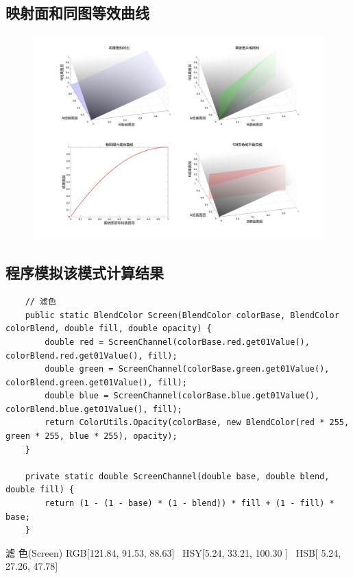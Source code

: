 \subsection{ 映射面和同图等效曲线}
\begin{figure}[h!]
	\centering
	\includegraphics[width=\linewidth]{figure/滤色}
	\caption{}
	\label{fig:}
\end{figure}


\subsection{ 程序模拟该模式计算结果}

\begin{lstlisting}
	// 滤色
	public static BlendColor Screen(BlendColor colorBase, BlendColor colorBlend, double fill, double opacity) {
		double red = ScreenChannel(colorBase.red.get01Value(), colorBlend.red.get01Value(), fill);
		double green = ScreenChannel(colorBase.green.get01Value(), colorBlend.green.get01Value(), fill);
		double blue = ScreenChannel(colorBase.blue.get01Value(), colorBlend.blue.get01Value(), fill);
		return ColorUtils.Opacity(colorBase, new BlendColor(red * 255, green * 255, blue * 255), opacity);
	}
	
	private static double ScreenChannel(double base, double blend, double fill) {
		return (1 - (1 - base) * (1 - blend)) * fill + (1 - fill) * base;
	}
\end{lstlisting}


\begin{result}
\item 滤    色(Screen)        RGB[121.84,  91.53,  88.63]~ HSY[5.24,  33.21, 100.30  ]~ HSB[  5.24,  27.26,  47.78]
\end{result}

